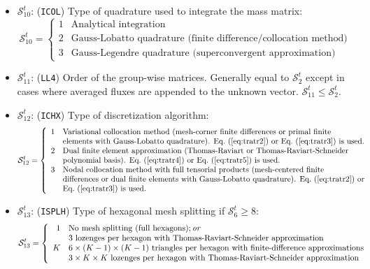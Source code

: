 \begin{itemize}
\item $\mathcal{S}^{t}_{10}$: ({\tt ICOL}) Type of quadrature used to integrate
the mass matrix:
\begin{displaymath}
\mathcal{S}^{t}_{10} = \left\{
\begin{array}{rl}
 1 & \textrm{Analytical integration} \\
 2 & \textrm{Gauss-Lobatto quadrature (finite difference/collocation method)} \\
 3 & \textrm{Gauss-Legendre quadrature (superconvergent approximation)}
\end{array} \right.
\end{displaymath}

\item $\mathcal{S}^{t}_{11}$: ({\tt LL4}) Order of the group-wise matrices.
Generally equal to
$\mathcal{S}^{t}_{2}$ except in cases where averaged fluxes are appended to the
unknown vector. $\mathcal{S}^{t}_{11}\le\mathcal{S}^{t}_{2}$.

\item $\mathcal{S}^{t}_{12}$: ({\tt ICHX}) Type of discretization algorithm:
\begin{displaymath}
\mathcal{S}^{t}_{12} = \left\{
\begin{array}{rl}
 1 & \textrm{Variational collocation method (mesh-corner finite differences or primal finite} \\
   & \textrm{elements with Gauss-Lobatto quadrature). \Eq{tratr2} or \Eq{tratr3} is used.} \\
 2 & \textrm{Dual finite element approximation (Thomas-Raviart or Thomas-Raviart-Schneider} \\
   & \textrm{polynomial basis). \Eq{tratr4} or \Eq{tratr5} is used.} \\
 3 & \textrm{Nodal collocation method with full tensorial products (mesh-centered finite} \\
   & \textrm{differences or dual finite elements with Gauss-Lobatto quadrature). \Eq{tratr2} or} \\
   & \textrm{\Eq{tratr3} is used.}
\end{array} \right.
\end{displaymath}

\item $\mathcal{S}^{t}_{13}$: ({\tt ISPLH}) Type of hexagonal mesh splitting if $\mathcal{S}^{t}_{6}\ge 8$:
\begin{displaymath}
\mathcal{S}^{t}_{13} = \left\{
\begin{array}{rl}
 1 & \textrm{No mesh splitting (full hexagons)}; \emph{or} \\
   & \textrm{$3$ lozenges per hexagon with Thomas-Raviart-Schneider approximation} \\
 K & \textrm{$6\times(K-1)\times(K-1)$ triangles per hexagon with finite-difference approximations} \\
   & \textrm{$3\times K \times K$ lozenges per hexagon with Thomas-Raviart-Schneider approximation}
\end{array} \right.
\end{displaymath}


\end{itemize}

